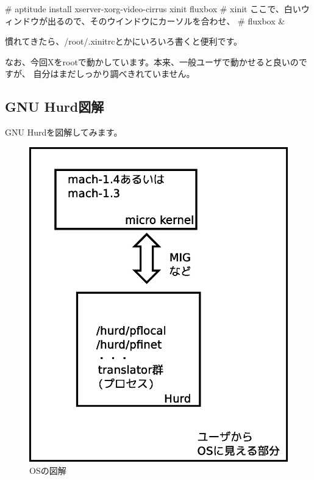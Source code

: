 \documentclass[mingoth,a4paper]{jsarticle}
\begin{document}
\begin{commandline}
# aptitude install xserver-xorg-video-cirrus xinit fluxbox
# xinit
ここで、白いウィンドウが出るので、そのウインドウにカーソルを合わせ、
# fluxbox &
\end{commandline}

 慣れてきたら、/root/.xinitrcとかにいろいろ書くと便利です。

 なお、今回Xをrootで動かしています。本来、一般ユーザで動かせると良いのですが、
自分はまだしっかり調べきれていません。

\subsection{GNU Hurd図解}

  GNU Hurdを図解してみます。

\begin{figure}[H]
\begin{center}
 \includegraphics[scale=0.3]{image201312/gnu-hurd-schema.eps}
 \caption{OSの図解}\label{fig:gnu-hurd-schema}
\end{center}
\end{figure}
\end{document}
